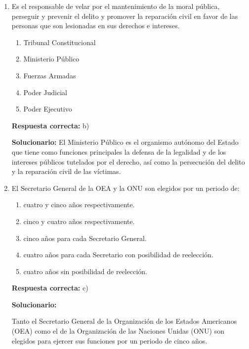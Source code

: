 \begin{enumerate}[resume]


	\vspace{2mm}

	\item Es el responsable de velar por el mantenimiento de la moral pública, perseguir y prevenir el delito y promover la reparación civil en favor de las personas que son lesionadas en sus derechos e intereses.

	\begin{enumerate}[label=\alph*)]
		\item Tribunal Constitucional
		\item Ministerio Público
		\item Fuerzas Armadas
		\item Poder Judicial
		\item Poder Ejecutivo
	\end{enumerate}

	\textbf{Respuesta correcta:} b)

	\vspace{2mm}
	\textbf{Solucionario:}
	El Ministerio Público es el organismo autónomo del Estado que tiene como funciones principales la defensa de la legalidad y de los intereses públicos tutelados por el derecho, así como la persecución del delito y la reparación civil de las víctimas.

	\vspace{6mm}

	\item El Secretario General de la OEA y la ONU son elegidos por un periodo de:

	\begin{enumerate}[label=\alph*)]
		\item cuatro y cinco años respectivamente.
		\item cinco y cuatro años respectivamente.
		\item cinco años para cada Secretario General.
		\item cuatro años para cada Secretario con posibilidad de reelección.
		\item cuatro años sin posibilidad de reelección.
	\end{enumerate}

	\textbf{Respuesta correcta:} c)

	\vspace{2mm}
	\textbf{Solucionario:}

	Tanto el Secretario General de la Organización de los Estados Americanos (OEA) como el de la Organización de las Naciones Unidas (ONU) son elegidos para ejercer sus funciones por un periodo de cinco años.


	\vspace{6mm}

\end{enumerate}


